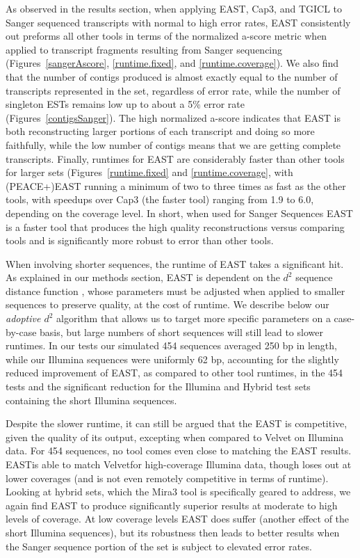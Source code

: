 \documentclass[10pt]{bmc_article}
\newcommand{\peace} {{\small PEACE}}
\newcommand{\capthree} {{\small Cap3}}
\newcommand{\tgicl} {{\small TGICL}}
\newcommand{\east} {{\small EAST}}
\newcommand{\velvet}{{\small Velvet}}
\newcommand{\mira}{{\small Mira3}}
\newenvironment{bmcformat}{\begin{raggedright}\baselineskip20pt\sloppy\setboolean{publ}{false}}{\end{raggedright}\baselineskip20pt\sloppy}
\begin{document}
\begin{bmcformat}
As observed in the results section, when applying \east, \capthree,
and \tgicl\/ to Sanger sequenced transcripts with normal to high error
rates, \east\/ consistently out preforms all other tools in terms of
the normalized a-score metric when applied to transcript fragments
resulting from Sanger sequencing (Figures~\ref{sangerAscore},
\ref{runtime.fixed}, and \ref{runtime.coverage}).  We also find that
the number of contigs produced is almost exactly equal to the number
of transcripts represented in the set, regardless of error rate, while
the number of singleton ESTs remains low up to about a 5\% error rate
(Figures~\ref{contigsSanger}).  The high normalized a-score indicates
that \east\/ is both reconstructing larger portions of each transcript
and doing so more faithfully, while the low number of contigs means
that we are getting complete transcripts.  Finally, runtimes for
\east\/ are considerably faster than other tools for larger sets
(Figures~\ref{runtime.fixed} and \ref{runtime.coverage}, with
(\peace+)\east\/ running a minimum of two to three times as fast as
the other tools, with speedups over \capthree\/ (the faster tool)
ranging from 1.9 to 6.0, depending on the coverage level.  In short,
when used for Sanger Sequences \east\/ is a faster tool that produces
the high quality reconstructions versus comparing tools and is
significantly more robust to error than other tools.

When involving shorter sequences, the runtime of \east\/ takes a
significant hit.  As explained in our methods section, \east\/ is
dependent on the $d^2$ sequence distance function \cite{Hide94}, whose
parameters must be adjusted when applied to smaller sequences to
preserve quality, at the cost of runtime.  We describe below our {\it
  adoptive $d^2$} algorithm that allows us to target more specific
parameters on a case-by-case basis, but large numbers of short
sequences will still lead to slower runtimes.  In our tests our
simulated 454 sequences averaged 250 bp in length, while our Illumina
sequences were uniformly 62 bp, accounting for the slightly reduced
improvement of \east, as compared to other tool runtimes, in the 454 tests and
the significant reduction for the Illumina and Hybrid test sets
containing the short Illumina sequences.

Despite the slower runtime, it can still be argued that the \east\/ is
competitive, given the quality of its output, excepting when compared
to \velvet\/ on Illumina data.  For 454 sequences, no tool comes even
close to matching the \east\/ results.  \east is able to match
\velvet for high-coverage Illumina data, though loses out at lower
coverages (and is not even remotely competitive in terms of runtime).
Looking at hybrid sets, which the \mira\/ tool is specifically geared
to address, we again find \east\/ to produce significantly superior
results at moderate to high levels of coverage.  At low coverage
levels \east\/ does suffer (another effect of the short
Illumina sequences), but its robustness then leads to
better results when the Sanger sequence portion of the set is subject
to elevated error rates.


\end{bmcformat}
\end{document}
